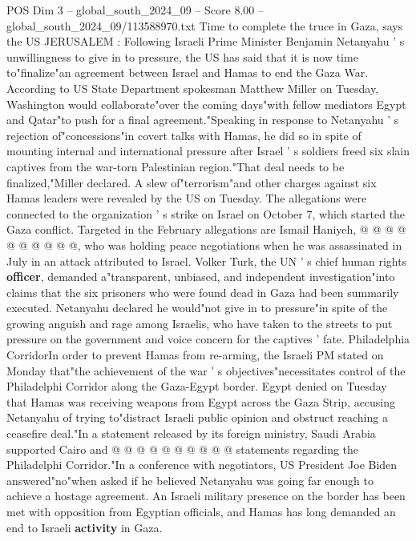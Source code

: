 \begin{textsample}{POS Dim 3 – global\_south\_2024\_09 – Score 8.00 – global\_south\_2024\_09/113588970.txt}  \label{ex:f3_pos_336}
Time to complete the truce in Gaza, says the US JERUSALEM : Following Israeli Prime Minister Benjamin Netanyahu ' s unwillingness to give in to pressure, the US has said that it is now time to"finalize"an agreement between Israel and Hamas to end the Gaza War.
According to US State Department spokesman Matthew Miller on Tuesday, Washington would collaborate"over the coming days"with fellow mediators Egypt and Qatar"to push for a final agreement."Speaking in response to Netanyahu ' s rejection of"concessions"in covert talks with Hamas, he did so in spite of mounting internal and international pressure after Israel ' s soldiers freed six slain captives from the war-torn Palestinian region."That deal needs to be finalized,"Miller declared.
A slew of"terrorism"and other charges against six Hamas leaders were revealed by the US on Tuesday.
The allegations were connected to the organization ' s strike on Israel on October 7, which started the Gaza conflict.
Targeted in the February allegations are Ismail Haniyeh, @ @ @ @ @ @ @ @ @ @, who was holding peace negotiations when he was assassinated in July in an attack attributed to Israel.
Volker Turk, the UN ' s chief human rights \textbf{officer}, demanded a"transparent, unbiased, and independent investigation"into claims that the six prisoners who were found dead in Gaza had been summarily executed.
Netanyahu declared he would"not give in to pressure"in spite of the growing anguish and rage among Israelis, who have taken to the streets to put pressure on the government and voice concern for the captives ' fate.
Philadelphia CorridorIn order to prevent Hamas from re-arming, the Israeli PM stated on Monday that"the achievement of the war ' s objectives"necessitates control of the Philadelphi Corridor along the Gaza-Egypt border.
Egypt denied on Tuesday that Hamas was receiving weapons from Egypt across the Gaza Strip, accusing Netanyahu of trying to"distract Israeli public opinion and obstruct reaching a ceasefire deal."In a statement released by its foreign ministry, Saudi Arabia supported Cairo and @ @ @ @ @ @ @ @ @ @ statements regarding the Philadelphi Corridor."In a conference with negotiators, US President Joe Biden answered"no"when asked if he believed Netanyahu was going far enough to achieve a hostage agreement.
An Israeli military presence on the border has been met with opposition from Egyptian officials, and Hamas has long demanded an end to Israeli \textbf{activity} in Gaza.

\end{textsample}
